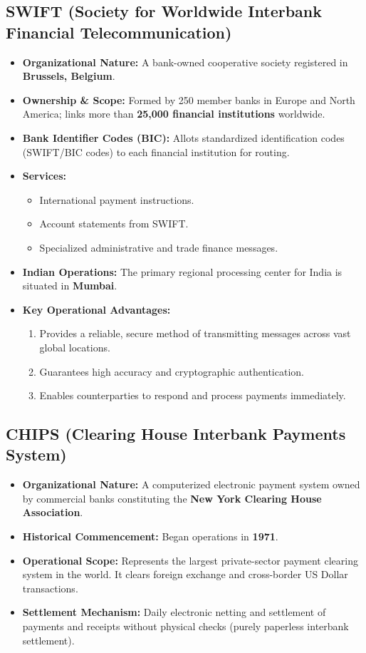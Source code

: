 \subsection{SWIFT (Society for Worldwide Interbank Financial Telecommunication)}
\begin{itemize}[leftmargin=*]
    \item \textbf{Organizational Nature:} A bank-owned cooperative society registered in \textbf{Brussels, Belgium}.
    \item \textbf{Ownership \& Scope:} Formed by 250 member banks in Europe and North America; links more than \textbf{25,000 financial institutions} worldwide.
    \item \textbf{Bank Identifier Codes (BIC):} Allots standardized identification codes (SWIFT/BIC codes) to each financial institution for routing.
    \item \textbf{Services:}
    \begin{itemize}[noitemsep]
        \item International payment instructions.
        \item Account statements from SWIFT.
        \item Specialized administrative and trade finance messages.
    \end{itemize}
    \item \textbf{Indian Operations:} The primary regional processing center for India is situated in \textbf{Mumbai}.
    \item \textbf{Key Operational Advantages:}
    \begin{enumerate}[noitemsep]
        \item Provides a reliable, secure method of transmitting messages across vast global locations.
        \item Guarantees high accuracy and cryptographic authentication.
        \item Enables counterparties to respond and process payments immediately.
    \end{enumerate}
\end{itemize}

\subsection{CHIPS (Clearing House Interbank Payments System)}
\begin{itemize}[leftmargin=*]
    \item \textbf{Organizational Nature:} A computerized electronic payment system owned by commercial banks constituting the \textbf{New York Clearing House Association}.
    \item \textbf{Historical Commencement:} Began operations in \textbf{1971}.
    \item \textbf{Operational Scope:} Represents the largest private-sector payment clearing system in the world. It clears foreign exchange and cross-border US Dollar transactions.
    \item \textbf{Settlement Mechanism:} Daily electronic netting and settlement of payments and receipts without physical checks (purely paperless interbank settlement).
\end{itemize}

